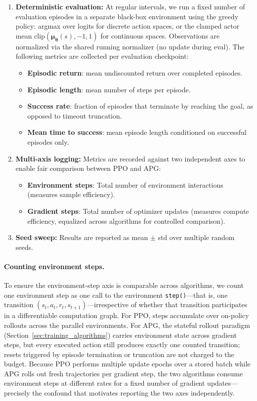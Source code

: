 \documentclass[11pt,a4paper]{article}
\newcommand{\btheta}{\bm{\theta}}
\newcommand{\bmu}{\bm{\mu}}
\begin{document}
\begin{enumerate}
  \item \textbf{Deterministic evaluation:} At regular intervals, we run a fixed number of evaluation episodes in a separate black-box environment using the greedy policy: argmax over logits for discrete action spaces, or the clamped actor mean $\text{clip}(\bmu_{\btheta}(s), -1, 1)$ for continuous spaces. Observations are normalized via the shared running normalizer (no update during eval). The following metrics are collected per evaluation checkpoint:
  \begin{itemize}
    \item \textbf{Episodic return}: mean undiscounted return over completed episodes.
    \item \textbf{Episodic length}: mean number of steps per episode.
    \item \textbf{Success rate}: fraction of episodes that terminate by reaching the goal, as opposed to timeout truncation.
    \item \textbf{Mean time to success}: mean episode length conditioned on successful episodes only.
  \end{itemize}

  \item \textbf{Multi-axis logging:} Metrics are recorded against two independent axes to enable fair comparison between PPO and APG:
  \begin{itemize}
    \item \textbf{Environment steps}: Total number of environment interactions (measures sample efficiency).
    \item \textbf{Gradient steps}: Total number of optimizer updates (measures compute efficiency, equalized across algorithms for controlled comparison).
  \end{itemize}

  \item \textbf{Seed sweep:} Results are reported as mean $\pm$ std over multiple random seeds.
\end{enumerate}

\paragraph{Counting environment steps.}
To ensure the environment-step axis is comparable across algorithms, we count one environment step as one call to the environment \texttt{step()}---that is, one transition $(s_t, a_t, r_t, s_{t+1})$---irrespective of whether that transition participates in a differentiable computation graph. For PPO, steps accumulate over on-policy rollouts across the parallel environments. For APG, the stateful rollout paradigm (Section~\ref{sec:training_algorithms}) carries environment state across gradient steps, but every executed action still produces exactly one counted transition; resets triggered by episode termination or truncation are not charged to the budget. Because PPO performs multiple update epochs over a stored batch while APG rolls out fresh trajectories per gradient step, the two algorithms consume environment steps at different rates for a fixed number of gradient updates---precisely the confound that motivates reporting the two axes independently.
\end{document}
